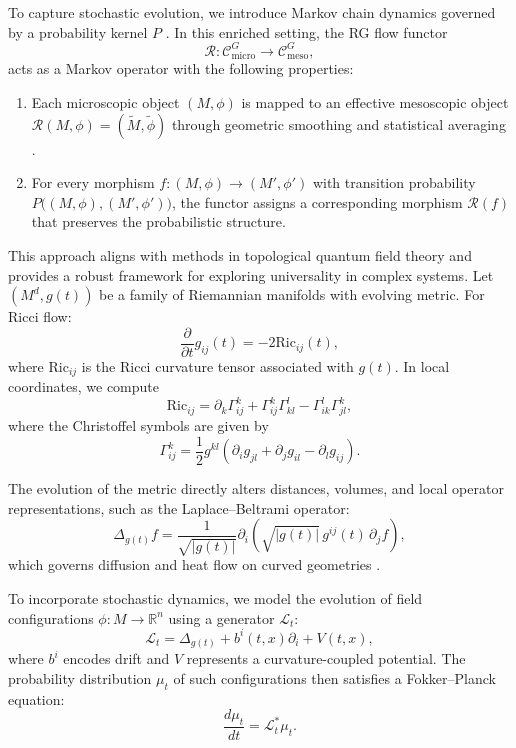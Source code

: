 	To capture stochastic evolution, we introduce Markov chain dynamics governed by a probability kernel \(P\) \cite{levin2009markov}. In this enriched setting, the RG flow functor
	\[
	\mathcal{R}: \mathcal{C}_{\text{micro}}^G \to \mathcal{C}_{\text{meso}}^G,
	\]
	acts as a Markov operator with the following properties:
	\begin{enumerate}[label=(\alph*)]
		\item Each microscopic object \((M, \phi)\) is mapped to an effective mesoscopic object \(\mathcal{R}(M, \phi) = (\widetilde{M}, \widetilde{\phi})\) through geometric smoothing and statistical averaging \cite{e2003multiscale}.
		\item For every morphism \(f: (M, \phi) \to (M', \phi')\) with transition probability \(P\big((M, \phi), (M', \phi')\big)\), the functor assigns a corresponding morphism \(\mathcal{R}(f)\) that preserves the probabilistic structure.
	\end{enumerate}
	
	This approach aligns with methods in topological quantum field theory \cite{atiyah1988topological, guillemin1984symplectic} and provides a robust framework for exploring universality in complex systems. Let $(M^d, g(t))$ be a family of Riemannian manifolds with evolving metric. For Ricci flow:
	\[
	\frac{\partial}{\partial t} g_{ij} (t) = - 2 \mathrm{Ric}_{ij} (t),
	\]
	where $\mathrm{Ric}_{ij}$ is the Ricci curvature tensor associated with $g(t)$. In local coordinates, we compute
	\[
	\mathrm{Ric}_{ij} = \partial_k \Gamma_{ij}^k + \Gamma_{ij}^k \Gamma_{kl}^l - \Gamma_{ik}^l \Gamma_{jl}^k,
	\]
	where the Christoffel symbols are given by
	\[
	\Gamma^{k}_{ij} = \frac{1}{2} g^{kl} (\partial_i g_{jl} + \partial_j g_{il} - \partial_l g_{ij}).
	\]
	
	The evolution of the metric directly alters distances, volumes, and local operator representations, such as the Laplace–Beltrami operator:
	\[
	\Delta_{g(t)} f = \frac{1}{\sqrt{|g(t)|}} \partial_i \left( \sqrt{|g(t)|} \, g^{ij}(t) \, \partial_j f \right),
	\]
	which governs diffusion and heat flow on curved geometries \cite{chow2004ricci, morgan2007ricci}.
	
	To incorporate stochastic dynamics, we model the evolution of field configurations $\phi: M \to \mathbb{R}^n$ using a generator $\mathcal{L}_t$:
	\[
	\mathcal{L}_t = \Delta_{g(t)} + b^i(t,x) \partial_i + V(t,x),
	\]
	where $b^i$ encodes drift and $V$ represents a curvature-coupled potential. The probability distribution $\mu_t$ of such configurations then satisfies a Fokker–Planck equation:
	\[
	\frac{d\mu_t}{dt} = \mathcal{L}_t^* \mu_t.
	\]
	
